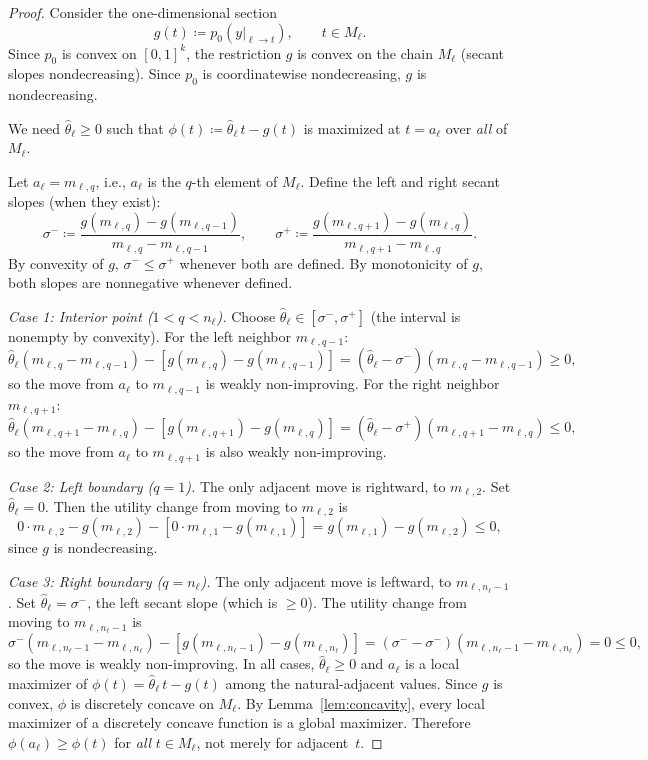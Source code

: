 \documentclass[11pt]{article}
\begin{document}
\begin{proof}
Consider the one-dimensional section
\[
  g(t) \coloneqq p_0(y|_{\ell \to t}), \qquad t \in M_\ell.
\]
Since $p_0$ is convex on $[0,1]^k$, the restriction $g$ is convex on the
chain $M_\ell$ (secant slopes nondecreasing).
Since $p_0$ is coordinatewise nondecreasing, $g$ is nondecreasing.

We need $\hat\theta_\ell \geq 0$ such that $\phi(t) \coloneqq \hat\theta_\ell\, t - g(t)$
is maximized at $t = a_\ell$ over \emph{all} of $M_\ell$.

Let $a_\ell = m_{\ell,q}$, i.e., $a_\ell$ is the $q$-th element of $M_\ell$.
Define the left and right secant slopes (when they exist):
\[
  \sigma^- \coloneqq \frac{g(m_{\ell,q}) - g(m_{\ell,q-1})}{m_{\ell,q} - m_{\ell,q-1}}, \qquad
  \sigma^+ \coloneqq \frac{g(m_{\ell,q+1}) - g(m_{\ell,q})}{m_{\ell,q+1} - m_{\ell,q}}.
\]
By convexity of $g$, $\sigma^- \leq \sigma^+$ whenever both are defined.
By monotonicity of $g$, both slopes are nonnegative whenever defined.

\emph{Case 1: Interior point ($1 < q < n_\ell$).}
Choose $\hat\theta_\ell \in [\sigma^-, \sigma^+]$ (the interval is nonempty by convexity).
For the left neighbor $m_{\ell,q-1}$:
\[
  \hat\theta_\ell (m_{\ell,q} - m_{\ell,q-1}) - [g(m_{\ell,q}) - g(m_{\ell,q-1})]
  = (\hat\theta_\ell - \sigma^-)(m_{\ell,q} - m_{\ell,q-1}) \geq 0,
\]
so the move from $a_\ell$ to $m_{\ell,q-1}$ is weakly non-improving.
For the right neighbor $m_{\ell,q+1}$:
\[
  \hat\theta_\ell (m_{\ell,q+1} - m_{\ell,q}) - [g(m_{\ell,q+1}) - g(m_{\ell,q})]
  = (\hat\theta_\ell - \sigma^+)(m_{\ell,q+1} - m_{\ell,q}) \leq 0,
\]
so the move from $a_\ell$ to $m_{\ell,q+1}$ is also weakly non-improving.

\emph{Case 2: Left boundary ($q = 1$).}
The only adjacent move is rightward, to $m_{\ell,2}$.
Set $\hat\theta_\ell = 0$.
Then the utility change from moving to $m_{\ell,2}$ is
\[
  0 \cdot m_{\ell,2} - g(m_{\ell,2}) - [0 \cdot m_{\ell,1} - g(m_{\ell,1})]
  = g(m_{\ell,1}) - g(m_{\ell,2}) \leq 0,
\]
since $g$ is nondecreasing.

\emph{Case 3: Right boundary ($q = n_\ell$).}
The only adjacent move is leftward, to $m_{\ell,n_\ell-1}$.
Set $\hat\theta_\ell = \sigma^-$, the left secant slope (which is $\geq 0$).
The utility change from moving to $m_{\ell,n_\ell-1}$ is
\[
  \sigma^-(m_{\ell,n_\ell-1} - m_{\ell,n_\ell}) - [g(m_{\ell,n_\ell-1}) - g(m_{\ell,n_\ell})]
  = (\sigma^- - \sigma^-)(m_{\ell,n_\ell-1} - m_{\ell,n_\ell}) = 0 \leq 0,
\]
so the move is weakly non-improving.
In all cases, $\hat\theta_\ell \geq 0$ and $a_\ell$ is a local maximizer of
$\phi(t) = \hat\theta_\ell\, t - g(t)$ among the natural-adjacent values.
Since $g$ is convex, $\phi$ is discretely concave on $M_\ell$.
By Lemma~\ref{lem:concavity}, every local maximizer of a discretely
concave function is a global maximizer.
Therefore $\phi(a_\ell) \geq \phi(t)$ for \emph{all} $t \in M_\ell$,
not merely for adjacent~$t$.
\end{proof}
\end{document}
